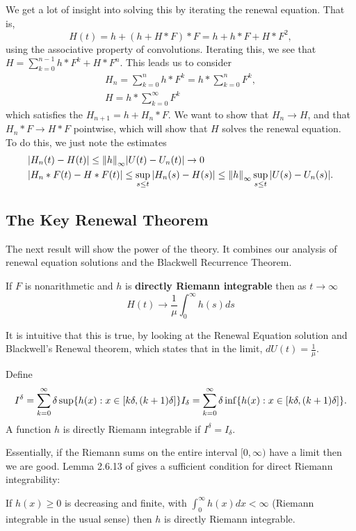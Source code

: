 \documentclass[12pt]{article}
\begin{document}
We get a lot of insight into solving this by iterating the renewal equation. That is,
\[
H(t) = h + (h + H*F)*F = h + h*F + H*F^2,
\]
using the associative property of convolutions. Iterating this, we see that $H = \sum_{k = 0}^{n-1} h *F^k + H * F^n$. This leads us to consider 
\begin{gather}
H_n = \sum_{k=0}^{n}h * F^k = h* \sum_{k=0}^n F^k,    \\
H = h* \sum_{k=0}^\infty F^k
\end{gather}
which satisfies the $H_{n+1} = h + H_n*F.$ We want to show that $H_n \rightarrow H$, and that $H_n * F \rightarrow H * F$ pointwise, which will show that $H$ solves the renewal equation.\\

To do this, we just note the estimates
\begin{align*}
&    |H_n(t) - H(t)| \leq \norm{h}_\infty |U(t) - U_n(t)| \rightarrow 0 \\
& |H_n*F(t) - H*F(t)| \leq \sup_{s \leq t}|H_n(s) - H(s)| \leq \norm{h}_\infty \sup_{s \leq t} |U(s) - U_n(s)|.
\end{align*}

\subsection{The Key Renewal Theorem}
The next result will show the power of the theory. It combines our analysis of renewal equation solutions and the Blackwell Recurrence Theorem.

\begin{theorem}
    If $F$ is nonarithmetic and $h$ is \textbf{directly Riemann integrable} then as $t \rightarrow \infty$
    \[
    H(t) \rightarrow \frac{1}{\mu} \int_0^\infty h(s) ds
    \]
\end{theorem}

It is intuitive that this is true, by looking at the Renewal Equation solution and Blackwell's Renewal theorem, which states that in the limit, $dU(t) = \frac{1}{\mu}$.

\begin{definition}  
Define
\begin{gather}
    I^\delta = \sum_{k=0}^\infty \delta \sup\lbrace h(x):x\in [k\delta,(k+1)\delta] \rbrace
    I_\delta = \sum_{k=0}^\infty \delta \inf\lbrace h(x):x\in [k\delta,(k+1)\delta] \rbrace.
\end{gather}
A function $h$ is directly Riemann integrable if $I^\delta = I_\delta$.
\end{definition}
Essentially, if the Riemann sums on the entire interval $[0,\infty)$ have a limit then we are good. Lemma 2.6.13 of \cite{durrett2019probability} gives a sufficient condition for direct Riemann integrability:
\begin{lemma}
If $h(x) \geq 0$ is decreasing and finite, with $\int_0^\infty h(x) dx < \infty$ (Riemann integrable in the usual sense) then $h$ is directly Riemann integrable.
\end{lemma}
\end{document}
